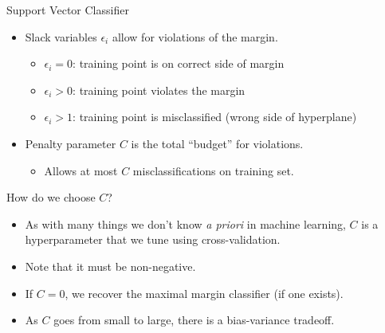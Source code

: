 \begin{frame}{Support Vector Classifier}
    \begin{itemize}
        \item Slack variables $\epsilon_i$ allow for violations of the margin.
        \begin{itemize}
            \item $\epsilon_i = 0$: training point is on correct side of margin
            \item $\epsilon_i > 0$: training point violates the margin
            \item $\epsilon_i > 1$: training point is misclassified (wrong side of hyperplane)
        \end{itemize}
        \item Penalty parameter $C$ is the total ``budget'' for violations.
        \begin{itemize}
            \item Allows at most $C$ misclassifications on training set.
        \end{itemize}
    \end{itemize}
\end{frame}


\begin{frame}{How do we choose $C$?}
    \begin{itemize}
        \item As with many things we don’t know \textit{a priori} in machine learning, $C$ is a hyperparameter that we tune using cross-validation.
        \item Note that it must be non-negative.
        \item If $C = 0$, we recover the maximal margin classifier (if one exists).
        \item As $C$ goes from small to large, there is a bias-variance tradeoff.
    \end{itemize}
\end{frame}

